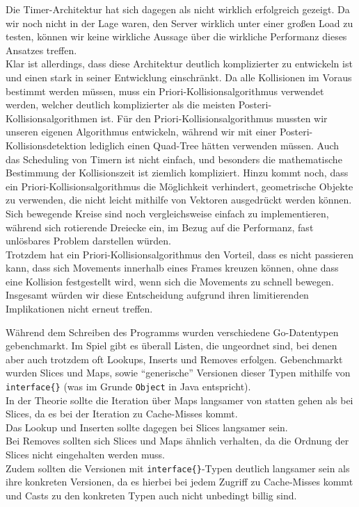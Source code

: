 Die Timer-Architektur hat sich dagegen als nicht wirklich erfolgreich gezeigt. Da wir noch nicht in der Lage waren, den Server wirklich unter einer großen Load zu testen, können wir keine wirkliche Aussage über die wirkliche Performanz dieses Ansatzes treffen. \\
Klar ist allerdings, dass diese Architektur deutlich komplizierter zu entwickeln ist und einen stark in seiner Entwicklung einschränkt. Da alle Kollisionen im Voraus bestimmt werden müssen, muss ein Priori-Kollisionsalgorithmus verwendet werden, welcher deutlich komplizierter als die meisten Posteri-Kollisionsalgorithmen ist. Für den Priori-Kollisionsalgorithmus mussten wir unseren eigenen Algorithmus entwickeln, während wir mit einer Posteri-Kollisionsdetektion lediglich einen Quad-Tree hätten verwenden müssen. Auch das Scheduling von Timern ist nicht einfach, und besonders die mathematische Bestimmung der Kollisionszeit ist ziemlich kompliziert. Hinzu kommt noch, dass ein Priori-Kollisionsalgorithmus die Möglichkeit verhindert, geometrische Objekte zu verwenden, die nicht leicht mithilfe von Vektoren ausgedrückt werden können. Sich bewegende Kreise sind noch vergleichsweise einfach zu implementieren, während sich rotierende Dreiecke ein, im Bezug auf die Performanz, fast unlösbares Problem darstellen würden. \\
Trotzdem hat ein Priori-Kollisionsalgorithmus den Vorteil, dass es nicht passieren kann, dass sich Movements innerhalb eines Frames kreuzen können, ohne dass eine Kollision festgestellt wird, wenn sich die Movements zu schnell bewegen. \\
Insgesamt würden wir diese Entscheidung aufgrund ihren limitierenden Implikationen nicht erneut treffen.

Während dem Schreiben des Programms wurden verschiedene Go-Datentypen gebenchmarkt. Im Spiel gibt es überall Listen, die ungeordnet sind, bei denen aber auch trotzdem oft Lookups, Inserts und Removes erfolgen. Gebenchmarkt wurden Slices und Maps, sowie ``generische'' Versionen dieser Typen mithilfe von \verb+interface{}+ (was im Grunde \verb+Object+ in Java entspricht). \\
In der Theorie sollte die Iteration über Maps langsamer von statten gehen als bei Slices, da es bei der Iteration zu Cache-Misses kommt. \\
Das Lookup und Inserten sollte dagegen bei Slices langsamer sein. \\
Bei Removes sollten sich Slices und Maps ähnlich verhalten, da die Ordnung der Slices nicht eingehalten werden muss. \\
Zudem sollten die Versionen mit \verb+interface{}+-Typen deutlich langsamer sein als ihre konkreten Versionen, da es hierbei bei jedem Zugriff zu Cache-Misses kommt und Casts zu den konkreten Typen auch nicht unbedingt billig sind. \\


